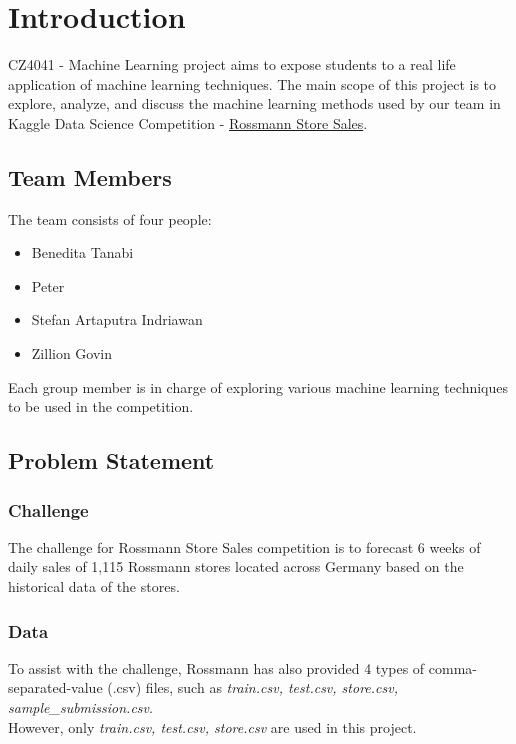 \chapter{Introduction}
CZ4041 - Machine Learning project aims to expose students to a real life application of machine learning techniques. The main scope of this project is to explore, analyze, and discuss the machine learning methods used by our team in Kaggle Data Science Competition - \href{https://www.kaggle.com/c/rossmann-store-sales}{Rossmann Store Sales}.


\section{Team Members}
The team consists of four people:
\begin{itemize}
	\item Benedita Tanabi
	\item Peter
	\item Stefan Artaputra Indriawan
	\item Zillion Govin
\end{itemize}
Each group member is in charge of exploring various machine learning techniques to be used in the competition.

\section{Problem Statement}

\subsection{Challenge}
The challenge for Rossmann Store Sales competition is to forecast 6 weeks of daily sales of 1,115 Rossmann stores located across Germany based on the historical data of the stores.

\subsection{Data}
To assist with the challenge, Rossmann has also provided 4 types of comma-separated-value (.csv) files, such as \textit{train.csv, test.csv, store.csv, sample\_submission.csv}.\\
However, only \textit{train.csv, test.csv, store.csv} are used in this project.
